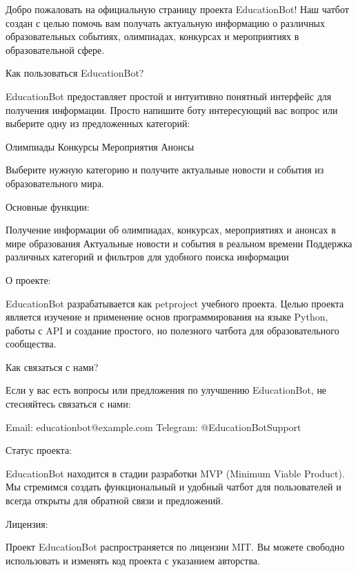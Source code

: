 \documentclass[letterpaper,10pt,russian]{sphinxmanual}
\begin{document}
\begin{sphinxVerbatim}[commandchars=\\\{\}]
Добро пожаловать на официальную страницу проекта EducationBot! Наш чат\PYGZhy{}бот создан с целью помочь вам получать актуальную информацию о различных образовательных событиях, олимпиадах, конкурсах и мероприятиях в образовательной сфере.

\PYGZsh{}\PYGZsh{}\PYGZsh{} Как пользоваться EducationBot?

EducationBot предоставляет простой и интуитивно понятный интерфейс для получения информации. Просто напишите боту интересующий вас вопрос или выберите одну из предложенных категорий:

\PYGZhy{} Олимпиады
\PYGZhy{} Конкурсы
\PYGZhy{} Мероприятия
\PYGZhy{} Анонсы

Выберите нужную категорию и получите актуальные новости и события из образовательного мира.

\PYGZsh{}\PYGZsh{}\PYGZsh{} Основные функции:

\PYGZhy{} Получение информации об олимпиадах, конкурсах, мероприятиях и анонсах в мире образования
\PYGZhy{} Актуальные новости и события в реальном времени
\PYGZhy{} Поддержка различных категорий и фильтров для удобного поиска информации

\PYGZsh{}\PYGZsh{}\PYGZsh{} О проекте:

EducationBot разрабатывается как pet\PYGZhy{}project учебного проекта. Целью проекта является изучение и применение основ программирования на языке Python, работы с API и создание простого, но полезного чат\PYGZhy{}бота для образовательного сообщества.

\PYGZsh{}\PYGZsh{}\PYGZsh{} Как связаться с нами?

Если у вас есть вопросы или предложения по улучшению EducationBot, не стесняйтесь связаться с нами:

\PYGZhy{} Email: educationbot@example.com
\PYGZhy{} Telegram: @EducationBotSupport

\PYGZsh{}\PYGZsh{}\PYGZsh{} Статус проекта:

EducationBot находится в стадии разработки MVP (Minimum Viable Product). Мы стремимся создать функциональный и удобный чат\PYGZhy{}бот для пользователей и всегда открыты для обратной связи и предложений.

\PYGZsh{}\PYGZsh{}\PYGZsh{} Лицензия:

Проект EducationBot распространяется по лицензии MIT. Вы можете свободно использовать и изменять код проекта с указанием авторства.


\end{sphinxVerbatim}
\end{document}
